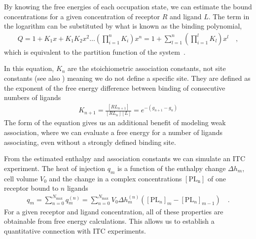 \documentclass[10pt,final]{article}
\begin{document}
By knowing the free energies of each occupation state, we can estimate the bound concentrations for a given concentration of receptor $R$ and ligand $L$.
%
The term in the logarithm can be substituted by what is known as the binding polynomial,
%
\begin{align}
 Q = 1 + K_1x + K_1K_2x^2 \dots \left(\prod\limits_{i=1}^{n} K_i\right) x^n = 1 + \sum\limits_{l=1}^n \left(\prod\limits_{i=1}^{l} K_l\right)x^l \quad,
 \label{equation:bindingpolynomial}
\end{align}
which is equivalent to the partition function of the system~\autocite{Dill2010a}.

In this equation, $K_n$ are the stoichiometric association constants, not site constants (see also ) meaning we do not define a specific site.
%
They are defined as the exponent of the free energy difference between binding of consecutive numbers of ligands
\begin{align}
K_{n+1} = \frac{[RL_{n+1}]}{[RL_n][L]} = e^{-(g_{n+1}-g_n)}
\label{eq:K_eq}
\end{align}
%
The form of the equation gives us an additional benefit of modeling weak association, where we can evaluate a free energy for a number of ligands associating, even without a strongly defined binding site.

From the estimated enthalpy and association constants we can simulate an ITC experiment.
%
The heat of injection $q_m$ is a function of the enthalpy change $\Delta h_m$, cell volume $V_0$ and the change in a complex concentrations $[\mathrm{PL_n}]$ of one receptor bound to $n$ ligands
%
\begin{align}
 q_m = \sum \limits_{n=0}^{N_\mathrm{max}} q_m^{(n)} = \sum \limits_{n=0}^{N_\mathrm{max}} V_0 \Delta h_m^{(n)} \left( [\mathrm{PL}_n]_m - [\mathrm{PL}_n]_{m-1} \right) \quad. \label{equation:liberated-heat}
\end{align}
%
For a given receptor and ligand concentration, all of these properties are obtainable from free energy calculations. 
%
This allows us to establish a quantitative connection with ITC experiments.
\end{document}
